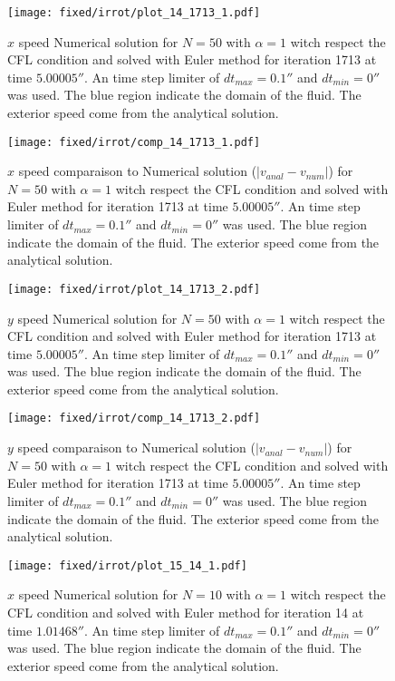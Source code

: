 \begin{figure}
\texttt{[image: fixed/irrot/plot\_14\_1713\_1.pdf]}
\caption{$x$ speed Numerical solution for $N=50$ with $\alpha=1$ witch respect the CFL condition and solved with Euler method
for iteration 1713 at time $\unit{5.00005}{\second}$.
An time step limiter of $dt_{max}=\unit{0.1}{\second}$ and $dt_{min}=\unit{0}{\second}$ was used.
The blue region indicate the domain of the fluid. The exterior speed come from the analytical solution.
\label{fix:plot_14_1713_1}
}
\end{figure}

\begin{figure}
\texttt{[image: fixed/irrot/comp\_14\_1713\_1.pdf]}
\caption{$x$ speed comparaison to Numerical solution ($|v_{anal}-v_{num}|$) for $N=50$ with $\alpha=1$ witch respect the CFL condition and solved with Euler method
for iteration 1713 at time $\unit{5.00005}{\second}$.
An time step limiter of $dt_{max}=\unit{0.1}{\second}$ and $dt_{min}=\unit{0}{\second}$ was used.
The blue region indicate the domain of the fluid. The exterior speed come from the analytical solution.
\label{fix:comp_14_1713_1}
}
\end{figure}

\begin{figure}
\texttt{[image: fixed/irrot/plot\_14\_1713\_2.pdf]}
\caption{$y$ speed Numerical solution for $N=50$ with $\alpha=1$ witch respect the CFL condition and solved with Euler method
for iteration 1713 at time $\unit{5.00005}{\second}$.
An time step limiter of $dt_{max}=\unit{0.1}{\second}$ and $dt_{min}=\unit{0}{\second}$ was used.
The blue region indicate the domain of the fluid. The exterior speed come from the analytical solution.
\label{fix:plot_14_1713_2}
}
\end{figure}

\begin{figure}
\texttt{[image: fixed/irrot/comp\_14\_1713\_2.pdf]}
\caption{$y$ speed comparaison to Numerical solution ($|v_{anal}-v_{num}|$) for $N=50$ with $\alpha=1$ witch respect the CFL condition and solved with Euler method
for iteration 1713 at time $\unit{5.00005}{\second}$.
An time step limiter of $dt_{max}=\unit{0.1}{\second}$ and $dt_{min}=\unit{0}{\second}$ was used.
The blue region indicate the domain of the fluid. The exterior speed come from the analytical solution.
\label{fix:comp_14_1713_2}
}
\end{figure}

\begin{figure}
\texttt{[image: fixed/irrot/plot\_15\_14\_1.pdf]}
\caption{$x$ speed Numerical solution for $N=10$ with $\alpha=1$ witch respect the CFL condition and solved with Euler method
for iteration 14 at time $\unit{1.01468}{\second}$.
An time step limiter of $dt_{max}=\unit{0.1}{\second}$ and $dt_{min}=\unit{0}{\second}$ was used.
The blue region indicate the domain of the fluid. The exterior speed come from the analytical solution.
\label{fix:plot_15_14_1}
}
\end{figure}

